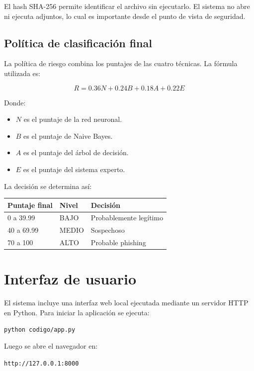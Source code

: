 \documentclass[12pt,letterpaper]{article}
\begin{document}
El hash SHA-256 permite identificar el archivo sin ejecutarlo. El sistema no abre ni ejecuta adjuntos, lo cual es importante desde el punto de vista de seguridad.

\subsection{Política de clasificación final}

La política de riesgo combina los puntajes de las cuatro técnicas. La fórmula utilizada es:

\[
R = 0.36N + 0.24B + 0.18A + 0.22E
\]

Donde:

\begin{itemize}
    \item \(N\) es el puntaje de la red neuronal.
    \item \(B\) es el puntaje de Naive Bayes.
    \item \(A\) es el puntaje del árbol de decisión.
    \item \(E\) es el puntaje del sistema experto.
\end{itemize}

La decisión se determina así:

\begin{longtable}{p{4cm}p{5cm}p{5cm}}
\toprule
\textbf{Puntaje final} & \textbf{Nivel} & \textbf{Decisión} \\
\midrule
0 a 39.99 & BAJO & Probablemente legítimo \\
40 a 69.99 & MEDIO & Sospechoso \\
70 a 100 & ALTO & Probable phishing \\
\bottomrule
\end{longtable}

\section{Interfaz de usuario}

El sistema incluye una interfaz web local ejecutada mediante un servidor HTTP en Python. Para iniciar la aplicación se ejecuta:

\begin{lstlisting}[style=pythonstyle]
python codigo/app.py
\end{lstlisting}

Luego se abre el navegador en:

\begin{center}
\texttt{http://127.0.0.1:8000}
\end{center}
\end{document}
